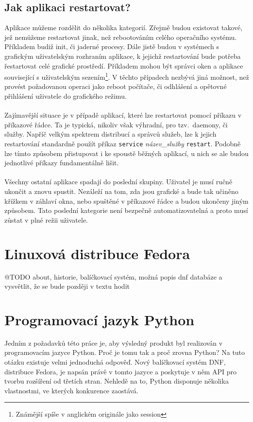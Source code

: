 \documentclass[
  field=inf,
  biblatex,
  glossaries,
  index
]{kidiplom}
\begin{document}
	\subsection{Jak aplikaci restartovat?}
	Aplikace můžeme rozdělit do několika kategorií. Zřejmě budou existovat takové, jež nemůžeme restartovat jinak, než rebootováním celého operačního systému. Příkladem budiž init, či jaderné procesy. Dále jistě budou v systémech s grafickým uživatelským rozhraním aplikace, k jejichž restartování bude potřeba řestartovat celé grafické prostředí. Příkladem mohou být správci oken a aplikace související s uživatelským sezením\footnote{Známější spíše v anglickém originále jako session}. V těchto případech nezbývá jiná možnost, než provést požadovanou operaci jako reboot počítače, či odhlášení a opětovné přihlášení uživatele do grafického režimu.
	\\
	\\
	Zajímavější situace je v případě aplikací, které lze restartovat pomocí příkazu v příkazové řádce. Ta je typická, nikoliv však výhradní, pro tzv.\ daemony, či služby. Napříč velkým spektrem distribucí a správců služeb, lze k jejich restartování standardně použít příkaz \texttt{service} \textit{název\_služby} \texttt{restart}. Podobně lze tímto způsobem přistupovat i ke spoustě běžných aplikací, u nich se ale budou jednotlivé příkazy fundamentálně lišit.
	\\
	\\
	Všechny ostatní aplikace spadají do poslední skupiny. Uživatel je musí ručně ukončit a znovu spustit. Nezáleží na tom, zda jsou grafické a bude tak učiněno křížkem v záhlaví okna, nebo spuštěné v příkazové řádce a budou ukončeny jiným způsobem. Tato poslední kategorie není bezpečně automatizovatelná a proto musí zůstat v plné režii uživatele.

\section{Linuxová distribuce Fedora}
@TODO about, historie, balíčkovací systém, možná popis dnf databáze a vysvětlit, že se bude později v textu hodit

\newpage
\section{Programovací jazyk Python}
Jedním z požadavků této práce je, aby výsledný produkt byl realizován v programovacím jazyce Python. Proč je tomu tak a proč zrovna Python? Na tuto otázku existuje velmi jednoduchá odpověď. Nový balíčkovací systém DNF, distribuce Fedora, je napsán právě v tomto jazyce a poskytuje v něm API pro tvorbu rozšíření od třetích stran. Nehledě na to, Python disponuje několika vlastnostmi, ve kterých konkurence zaostává.
\end{document}

